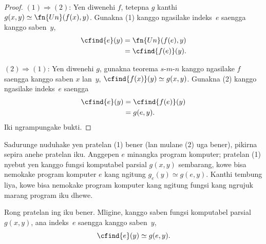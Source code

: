 \documentclass[../../../include/open-logic-section]{subfiles}
\begin{document}
\begin{proof}
$(1) \Rightarrow (2)$: Yen diwenehi $f$, tetepna
$g$ kanthi $g(x,y) \simeq \fn{Un}(f(x),y)$.
Gunakna (1) kanggo ngasilake indeks~$e$
saengga kanggo saben~$y$,
\begin{align*}
\cfind{e}(y) & = \fn{Un}(f(e),y) \\
& = \cfind{f(e)}(y).
\end{align*}

$(2) \Rightarrow (1)$: Yen diwenehi $g$,
gunakna teorema $s$-$m$-$n$ kanggo ngasilake
$f$ saengga kanggo saben $x$ lan~$y$,
$\cfind{f(x)}(y) \simeq g(x,y)$. Gunakna (2)
kanggo ngasilake indeks~$e$ saengga
\begin{align*}
\cfind{e}(y) & = \cfind{f(e)}(y) \\
& = g(e,y).
\end{align*}
Iki ngrampungake bukti.
\end{proof}

\begin{explain}
Sadurunge nuduhake yen pratelan (1) bener
(lan mulane (2) uga bener), pikirna sepira
anehe pratelan iku. Anggepen $e$ minangka
program komputer; pratelan (1) nyebut yen
kanggo fungsi komputabel parsial $g(x,y)$
sembarang, kowe bisa nemokake program
komputer $e$ kang ngitung $g_e(y) \simeq g(e,y)$.
Kanthi tembung liya, kowe bisa nemokake
program komputer kang ngitung fungsi
kang ngrujuk marang program iku dhewe.
\end{explain}

\begin{thm}
Rong pratelan ing 
iku bener. Mligine, kanggo saben fungsi
komputabel parsial $g(x,y)$, ana indeks~$e$
saengga kanggo saben~$y$,
\[
\cfind{e}(y) \simeq g(e,y).
\]
\end{thm}
\end{document}
